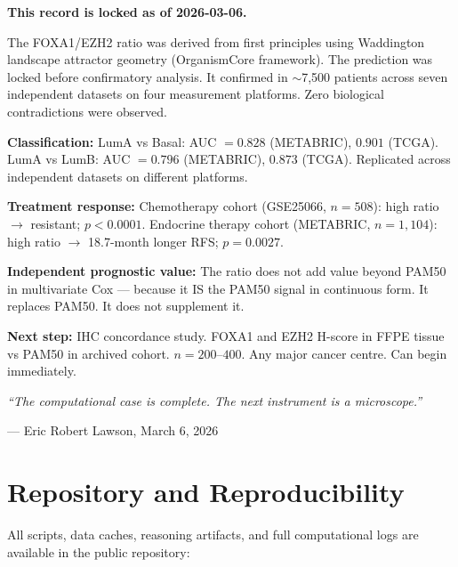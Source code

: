 \documentclass[12pt, a4paper]{article}
\begin{document}
\begin{center}
\colorbox{warnbox}{
\begin{minipage}{0.88\textwidth}
\vspace{0.6em}
\textbf{This record is locked as of 2026-03-06.}

\medskip
The FOXA1/EZH2 ratio was derived from first principles
using Waddington landscape attractor geometry
(OrganismCore framework). The prediction was locked
before confirmatory analysis. It confirmed in
$\sim$7,500 patients across seven independent datasets
on four measurement platforms. Zero biological
contradictions were observed.

\medskip
\textbf{Classification:}
LumA vs Basal: AUC $= 0.828$ (METABRIC), $0.901$ (TCGA).
LumA vs LumB: AUC $= 0.796$ (METABRIC), $0.873$ (TCGA).
Replicated across independent datasets on different platforms.

\medskip
\textbf{Treatment response:}
Chemotherapy cohort (GSE25066, $n=508$):
high ratio $\rightarrow$ resistant; $p < 0.0001$.
Endocrine therapy cohort (METABRIC, $n=1{,}104$):
high ratio $\rightarrow$ 18.7-month longer RFS; $p = 0.0027$.

\medskip
\textbf{Independent prognostic value:}
The ratio does not add value beyond PAM50 in multivariate
Cox --- because it IS the PAM50 signal in continuous form.
It replaces PAM50. It does not supplement it.

\medskip
\textbf{Next step:} IHC concordance study.
FOXA1 and EZH2 H-score in FFPE tissue vs PAM50 in archived
cohort. $n = 200$--$400$. Any major cancer centre.
Can begin immediately.

\medskip
\textit{``The computational case is complete.
The next instrument is a microscope.''}

\vspace{0.4em}
\hfill --- Eric Robert Lawson, March 6, 2026
\vspace{0.4em}
\end{minipage}
}
\end{center}

\section*{Repository and Reproducibility}

All scripts, data caches, reasoning artifacts, and full
computational logs are available in the public repository:
\end{document}
